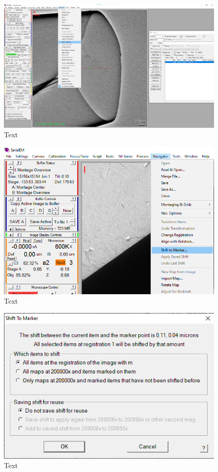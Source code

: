 \documentclass[12pt, a4paper]{scrartcl}
\begin{document}
\begin{figure}[H]
\includegraphics[width=\linewidth]{screenshots/PointOnLandmarkZoom.png}
\caption{Text}
\end{figure}

\begin{figure}[H]
\includegraphics[width=\linewidth]{screenshots/ShiftToMarker.png}
\caption{Text}
\end{figure}

\begin{figure}[H]
\includegraphics[width=\linewidth]{screenshots/ShiftToMarkerMapMenu.png}
\caption{Text}
\end{figure}
\end{document}
